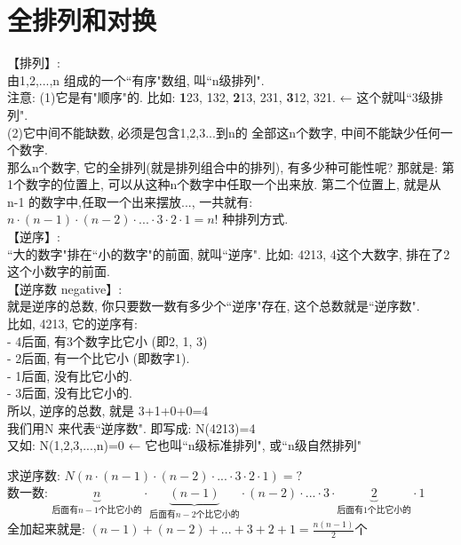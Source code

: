 \documentclass[UTF8]{ctexart}
\begin{document}
	
	
	
	\section{全排列和对换}
	
	【排列】:\\
	由1,2,...,n 组成的一个``有序"数组, 叫``n级排列".\\
	注意: (1)它是有"顺序"的. 比如: \textbf{1}23, 132, \textbf{2}13, 231, \textbf{3}12, 321.  ← 这个就叫``3级排列".\\
	
	(2)它中间不能缺数, 必须是包含1,2,3...到n的 全部这n个数字, 中间不能缺少任何一个数字. \\
	那么n个数字, 它的全排列(就是排列组合中的排列), 有多少种可能性呢? 那就是: 第1个数字的位置上, 可以从这种n个数字中任取一个出来放. 第二个位置上, 就是从 n-1 的数字中,任取一个出来摆放..., 一共就有: $n\cdot \left( n-1 \right) \cdot \left( n-2 \right) \cdot ...\cdot 3\cdot 2\cdot 1 = n!	$ 种排列方式.\\
	
	
	【逆序】:\\
	``大的数字"排在``小的数字"的前面, 就叫``逆序". 比如: 4213,  4这个大数字, 排在了2这个小数字的前面. \\
	
	
	【逆序数 negative】:\\	
	就是逆序的总数, 你只要数一数有多少个``逆序"存在, 这个总数就是``逆序数".\\
	比如, 4213, 它的逆序有: \\
	- 4后面, 有3个数字比它小 (即2, 1, 3) \\
	- 2后面, 有一个比它小 (即数字1). \\
	- 1后面, 没有比它小的. \\
	- 3后面, 没有比它小的. \\
	所以, 逆序的总数, 就是 3+1+0+0=4 \\
	
	我们用N 来代表``逆序数". 即写成: N(4213)=4 \\
	又如: N(1,2,3,...,n)=0 ← 它也叫``n级标准排列", 或``n级自然排列"\\
	
	\begin{myEnvSample}
	求逆序数: $	N\left( n\cdot \left( n-1 \right) \cdot \left( n-2 \right) \cdot ...\cdot 3\cdot 2\cdot 1 \right) =?	$\\
	数一数: $	\underset{\text{后面有}n-1\text{个比它小的}}{\underbrace{n}}\cdot \underset{\text{后面有}n-2\text{个比它小的}}{\underbrace{\left( n-1 \right) }}\cdot \left( n-2 \right) \cdot ...\cdot 3\cdot \underset{\text{后面有1个比它小的}}{\underbrace{2}}\cdot 1		$ \\
	全加起来就是: $\left( n-1 \right) +\left( n-2 \right) +...+3+2+1=\frac{n\left( n-1 \right)}{2}$个	
	\end{myEnvSample}
\end{document}

